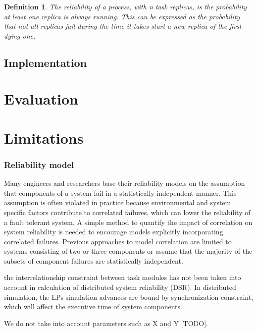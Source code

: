 \documentclass{cslthse-msc}
\newtheorem{definition}{Definition}[chapter]
\begin{document}
\begin{definition} \label{def:dyn_repl_reliability}
The reliability of a process, with n task replicas, is the probability at least one replica is always running. This can be expressed as the probability that not all replicas fail during the time it takes start a new replica of the first dying one.
\end{definition}




\section{Implementation} \label{sec:implementation}


\chapter{Evaluation} \label{ch:evaluation}

\chapter{Limitations} \label{ch:limitations}
\subsection{Reliability model}


\label{sec:limitations_reliability_model}
Many engineers and researchers base their reliability models on the assumption that components of a system fail in a statistically independent manner. This assumption is often violated in practice because environmental and system specific factors contribute to correlated failures, which can lower the reliability of a fault tolerant system. A simple method to quantify the impact of correlation on system reliability is needed to encourage models explicitly incorporating correlated failures. Previous approaches to model correlation are limited to systems consisting of two or three components or assume that the majority of the subsets of component failures are statistically independent. \cite{discContRelModel}


the interrelationship constraint between task modules has not been taken into account in calculation of distributed system reliability (DSR). In distributed simulation, the LPs simulation advances are bound by synchronization constraint, which will affect the executive time of system components. \cite{relModelDistSimSystem}

We do not take into account parameters such as X and Y [TODO].
\end{document}
